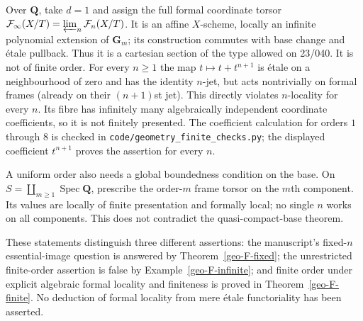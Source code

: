 \begin{example}
\label{geo-F-infinite}
Over $\mathbf Q$, take $d=1$ and assign the full formal coordinate torsor
$\mathcal F_\infty(X/T)=\varprojlim_n\mathcal F_n(X/T)$. It is an affine
$X$-scheme, locally an infinite polynomial extension of $\mathbf G_m$;
its construction commutes with base change and \'{e}tale pullback. Thus it
is a cartesian section of the type allowed on 23/040. It is not of finite
order. For every $n\geq1$ the map $t\mapsto t+t^{n+1}$ is \'{e}tale on
a neighbourhood of zero and has the identity $n$-jet, but acts nontrivially
on formal frames (already on their $(n+1)$st jet). This directly violates
$n$-locality for every $n$. Its fibre has infinitely many algebraically
independent coordinate coefficients, so it is not finitely presented.
The coefficient calculation for orders $1$ through $8$ is checked in
\texttt{code/geometry\_finite\_checks.py}; the displayed coefficient
$t^{n+1}$ proves the assertion for every $n$.

A uniform order also needs a global boundedness condition on the base. On
$S=\coprod_{m\geq1}\operatorname{Spec}\mathbf Q$, prescribe the order-$m$
frame torsor on the $m$th component. Its values are locally of finite
presentation and formally local; no single $n$ works on all components.
This does not contradict the quasi-compact-base theorem.
\end{example}

These statements distinguish three different assertions: the manuscript's
fixed-$n$ essential-image question is answered by
Theorem~\ref{geo-F-fixed}; the unrestricted finite-order assertion is false
by Example~\ref{geo-F-infinite}; and finite order under explicit algebraic
formal locality and finiteness is proved in Theorem~\ref{geo-F-finite}.
No deduction of formal locality from mere \'{e}tale functoriality has been
asserted.


